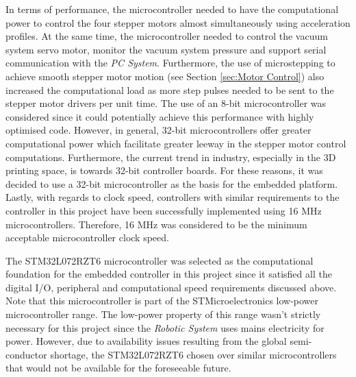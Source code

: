 In terms of performance, the microcontroller needed to have the computational power to control the four stepper motors almost simultaneously using acceleration profiles. At the same time, the microcontroller needed to control the vacuum system servo motor, monitor the vacuum system pressure and support serial communication with the \textit{PC System}. Furthermore, the use of microstepping to achieve smooth stepper motor motion (see Section \ref{sec:Motor Control}) also increased the computational load as more step pulses needed to be sent to the stepper motor drivers per unit time. The use of an 8-bit microcontroller was considered since it could potentially achieve this performance with highly optimised code. However, in general, 32-bit microcontrollers offer greater computational power which facilitate greater leeway in the stepper motor control computations. Furthermore, the current trend in industry, especially in the 3D printing space, is towards 32-bit controller boards. For these reasons, it was decided to use a 32-bit microcontroller as the basis for the embedded platform. Lastly, with regards to clock speed, controllers with similar requirements to the controller in this project have been successfully implemented using 16 MHz microcontrollers. Therefore, 16 MHz was considered to be the minimum acceptable microcontroller clock speed.

The STM32L072RZT6 microcontroller was selected as the computational foundation for the embedded controller in this project since it satisfied all the digital I/O, peripheral and computational speed requirements discussed above. Note that this microcontroller is part of the STMicroelectronics low-power microcontroller range. The low-power property of this range wasn't strictly necessary for this project since the \textit{Robotic System} uses mains electricity for power. However, due to availability issues resulting from the global semi-conductor shortage, the STM32L072RZT6 chosen over similar microcontrollers that would not be available for the foreseeable future.


